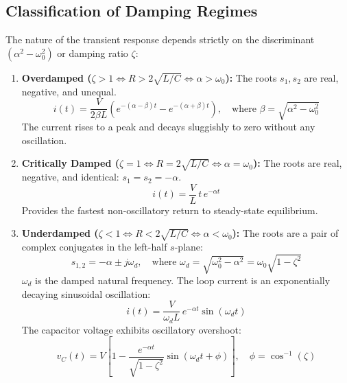 \documentclass[12pt,a4paper]{article}
\begin{document}
\subsection{Classification of Damping Regimes}

The nature of the transient response depends strictly on the discriminant $(\alpha^2 - \omega_0^2)$ or damping ratio $\zeta$:

\begin{tcolorbox}[defbox, title={\textbf{Three Classical Damping Regimes}}]
\begin{enumerate}[leftmargin=*]
  \item \textbf{Overdamped ($\zeta > 1 \iff R > 2\sqrt{L/C} \iff \alpha > \omega_0$):}
  The roots $s_1, s_2$ are real, negative, and unequal.
  \begin{equation}
    i(t) = \frac{V}{2\beta L}\left(e^{-(\alpha - \beta)t} - e^{-(\alpha + \beta)t}\right), \quad \text{where } \beta = \sqrt{\alpha^2 - \omega_0^2}
  \end{equation}
  The current rises to a peak and decays sluggishly to zero without any oscillation.

  \item \textbf{Critically Damped ($\zeta = 1 \iff R = 2\sqrt{L/C} \iff \alpha = \omega_0$):}
  The roots are real, negative, and identical: $s_1 = s_2 = -\alpha$.
  \begin{equation}
    i(t) = \frac{V}{L}\,t\,e^{-\alpha t}
  \end{equation}
  Provides the fastest non-oscillatory return to steady-state equilibrium.

  \item \textbf{Underdamped ($\zeta < 1 \iff R < 2\sqrt{L/C} \iff \alpha < \omega_0$):}
  The roots are a pair of complex conjugates in the left-half $s$-plane:
  \begin{equation}
    s_{1,2} = -\alpha \pm j\omega_d, \quad \text{where } \omega_d = \sqrt{\omega_0^2 - \alpha^2} = \omega_0\sqrt{1 - \zeta^2}
  \end{equation}
  $\omega_d$ is the damped natural frequency. The loop current is an exponentially decaying sinusoidal oscillation:
  \begin{equation}
    i(t) = \frac{V}{\omega_d L}\,e^{-\alpha t}\sin(\omega_d t)
  \end{equation}
  The capacitor voltage exhibits oscillatory overshoot:
  \begin{equation}
    v_C(t) = V\left[1 - \frac{e^{-\alpha t}}{\sqrt{1 - \zeta^2}}\sin(\omega_d t + \phi)\right], \quad \phi = \cos^{-1}(\zeta)
  \end{equation}
\end{enumerate}
\end{tcolorbox}
\end{document}
